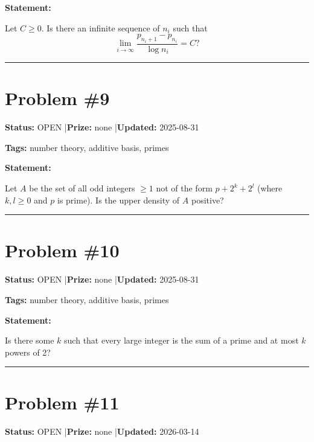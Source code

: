 \documentclass{article}
\begin{document}
\medskip

\noindent\textbf{Statement:}

Let $C\geq 0$. Is there an infinite sequence of $n_i$ such that\[\lim_{i\to \infty}\frac{p_{n_i+1}-p_{n_i}}{\log n_i}=C?\]

\noindent\rule{\linewidth}{0.4pt}


\section{Problem \#9}
\label{prob:9}

\noindent\textbf{Status:} OPEN \quad|\quad \textbf{Prize:} none \quad|\quad \textbf{Updated:} 2025-08-31

\noindent\textbf{Tags:} number theory, additive basis, primes

\medskip

\noindent\textbf{Statement:}

Let $A$ be the set of all odd integers $\geq 1$ not of the form $p+2^{k}+2^l$ (where $k,l\geq 0$ and $p$ is prime). Is the upper density of $A$ positive?

\noindent\rule{\linewidth}{0.4pt}


\section{Problem \#10}
\label{prob:10}

\noindent\textbf{Status:} OPEN \quad|\quad \textbf{Prize:} none \quad|\quad \textbf{Updated:} 2025-08-31

\noindent\textbf{Tags:} number theory, additive basis, primes

\medskip

\noindent\textbf{Statement:}

Is there some $k$ such that every large integer is the sum of a prime and at most $k$ powers of 2?

\noindent\rule{\linewidth}{0.4pt}


\section{Problem \#11}
\label{prob:11}

\noindent\textbf{Status:} OPEN \quad|\quad \textbf{Prize:} none \quad|\quad \textbf{Updated:} 2026-03-14
\end{document}
